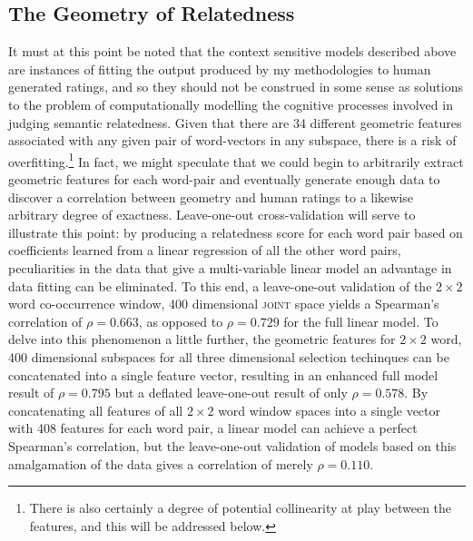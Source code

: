 \subsection{The Geometry of Relatedness}
It must at this point be noted that the context sensitive models described above are instances of fitting the output produced by my methodologies to human generated ratings, and so they should not be construed in some sense as solutions to the problem of computationally modelling the cognitive processes involved in judging semantic relatedness.  Given that there are 34 different geometric features associated with any given pair of word-vectors in any subspace, there is a risk of overfitting.\footnote{There is also certainly a degree of potential collinearity at play between the features, and this will be addressed below.}  In fact, we might speculate that we could begin to arbitrarily extract geometric features for each word-pair and eventually generate enough data to discover a correlation between geometry and human ratings to a likewise arbitrary degree of exactness.  Leave-one-out cross-validation will serve to illustrate this point: by producing a relatedness score for each word pair based on coefficients learned from a linear regression of all the other word pairs, peculiarities in the data that give a multi-variable linear model an advantage in data fitting can be eliminated.  To this end, a leave-one-out validation of the $2 \times 2$ word co-occurrence window, 400 dimensional \textsc{joint} space yields a Spearman's correlation of $\rho = 0.663$, as opposed to $\rho = 0.729$ for the full linear model.  To delve into this phenomenon a little further, the geometric features for $2 \times 2$ word, 400 dimensional subspaces for all three dimensional selection techinques can be concatenated into a single feature vector, resulting in an enhanced full model result of $\rho = 0.795$ but a deflated leave-one-out result of only $\rho = 0.578$.  By concatenating all features of all $2 \times 2$ word window spaces into a single vector with 408 features for each word pair, a linear model can achieve a perfect Spearman's correlation, but the leave-one-out validation of models based on this amalgamation of the data gives a correlation of merely $\rho = 0.110$.


